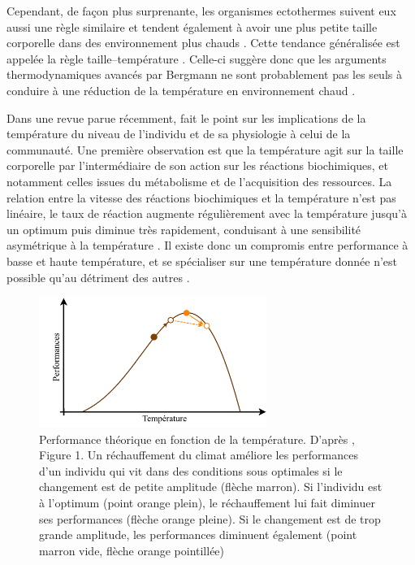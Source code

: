 Cependant, de façon plus surprenante, les organismes ectothermes suivent eux
aussi une règle similaire et tendent également à avoir une plus petite taille
corporelle dans des environnement plus chauds \autocites{angilletta2009a,ohlberger2013a}.
Cette tendance généralisée est appelée la règle taille--température
\autocites[``temperature--size rule''][]{atkinson1994a}. Celle-ci suggère donc
que les arguments thermodynamiques avancés par Bergmann ne sont probablement pas les seuls à
conduire à une réduction de la température en environnement chaud
\autocite{edeline2013a}.

Dans une revue parue récemment, \textcite{ohlberger2013a} fait le point sur les
implications de la température du niveau de l'individu et de sa physiologie à
celui de la communauté. Une première observation est que la température agit sur
la taille corporelle par l'intermédiaire de son action sur les réactions
biochimiques, et notamment celles issues du métabolisme et de l'acquisition des
ressources. La relation entre la vitesse des réactions biochimiques et la
température n'est pas linéaire, le taux de réaction augmente régulièrement avec
la température jusqu'à un optimum puis diminue très rapidement, conduisant à une
sensibilité asymétrique à la température \autocites{hochachka2002a,
angilletta2009a}. Il existe donc un compromis entre performance à basse et haute
température, et se spécialiser sur une température donnée n'est possible qu'au
détriment des autres \autocites{angilletta2009a}.

\begin{figure}[!ht] %
\centering
\includegraphics[width=0.66\textwidth]{1_CorpsDeThese/EA/Fig/ThermalCurve.pdf}
\caption[
Performance théorique en fonction de la température]{Performance théorique en
fonction de la température. D'après \textcites{ohlberger2013a}, Figure 1. Un
réchauffement du climat améliore les performances d'un individu qui vit dans
des conditions sous optimales si le changement est de petite amplitude (flèche
marron). Si l'individu est à l'optimum (point orange plein), le réchauffement
lui fait diminuer ses performances (flèche orange pleine). Si le changement est
de trop grande amplitude, les performances diminuent également (point marron
vide, flèche orange pointillée)}
\label{Fig:EA1}
\end{figure}


